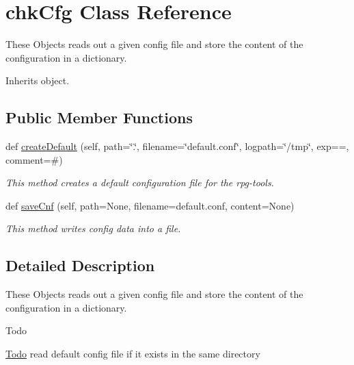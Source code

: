 \hypertarget{classrpgtoolbox_1_1confbox_1_1chkCfg}{}\section{chk\+Cfg Class Reference}
\label{classrpgtoolbox_1_1confbox_1_1chkCfg}


These Objects reads out a given config file and store the content of the configuration in a dictionary.  




Inherits object.

\subsection*{Public Member Functions}
\begin{DoxyCompactItemize}
\item 
def \hyperlink{classrpgtoolbox_1_1confbox_1_1chkCfg_a66e9d653925ded963afc456d24145c0a}{create\+Default} (self, path=\char`\"{}.\char`\"{}, filename=\char`\"{}default.\+conf\char`\"{}, logpath=\char`\"{}/tmp\char`\"{}, exp=\textquotesingle{}=\textquotesingle{}, comment=\textquotesingle{}\#\textquotesingle{})
\begin{DoxyCompactList}\small\item\em This method creates a default configuration file for the rpg-\/tools. \end{DoxyCompactList}\item 
def \hyperlink{classrpgtoolbox_1_1confbox_1_1chkCfg_a9757bd7448f940118f781e94d9c464c2}{save\+Cnf} (self, path=None, filename=\textquotesingle{}default.\+conf\textquotesingle{}, content=None)
\begin{DoxyCompactList}\small\item\em This method writes config data into a file. \end{DoxyCompactList}\end{DoxyCompactItemize}


\subsection{Detailed Description}
These Objects reads out a given config file and store the content of the configuration in a dictionary. 

\begin{DoxyRefDesc}{Todo}
\item[\hyperlink{todo__todo000013}{Todo}]read default config file if it exists in the same directory \end{DoxyRefDesc}


